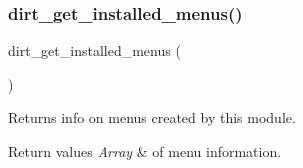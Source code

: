 \subsubsection{\texorpdfstring{dirt\+\_\+get\+\_\+installed\+\_\+menus()}{dirt\_get\_installed\_menus()}}
{\footnotesize\ttfamily dirt\+\_\+get\+\_\+installed\+\_\+menus (\begin{DoxyParamCaption}{ }\end{DoxyParamCaption})}

Returns info on menus created by this module.


\begin{DoxyRetVals}{Return values}
{\em Array} & of menu information. \\
\hline
\end{DoxyRetVals}
